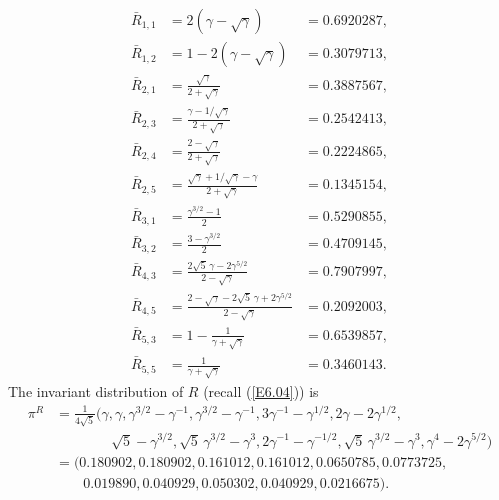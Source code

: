 \documentclass[11pt]{article}
\providecommand{\1}{\mathBB{1}}
\newcommand{\equ}[1]{(\ref{#1})}
\begin{document}
\begin{equation}
\label{E6.14}
\begin{array}{cll}
\bar R_{1,1}&=2(\gamma-\sqrt{\gamma})       &=0.6920287,\\[2mm]
\bar R_{1,2}&=1-2(\gamma-\sqrt{\gamma})      &=0.3079713,\\[2mm]
\bar R_{2,1}&=\frac{\sqrt{\gamma}}{2+\sqrt{\gamma}}&=0.3887567,\\[2mm]
\bar R_{2,3}&=\frac{\gamma-1/\sqrt{\gamma}}{2+\sqrt{\gamma}}&=0.2542413,\\[2mm]
\bar R_{2,4}&=\frac{2-\sqrt{\gamma}}{2+\sqrt{\gamma}}&=0.2224865,\\[2mm]
\bar R_{2,5}&=\frac{\sqrt{\gamma}+1/\sqrt{\gamma}-\gamma}{2+\sqrt{\gamma}}&=0.1345154,\\[2mm]
\bar R_{3,1}&=\frac{\gamma^{3/2}-1}{2}&=0.5290855,\\[2mm]
\bar R_{3,2}&=\frac{3-\gamma^{3/2}}{2}&=0.4709145,\\[2mm]
\bar R_{4,3}&=\frac{2\sqrt{5}\,\gamma-2\gamma^{5/2}}{2-\sqrt{\gamma}}&=0.7907997,\\[2mm]
\bar R_{4,5}&=\frac{2-\sqrt{\gamma}-2\sqrt{5}\,\gamma+2\gamma^{5/2}}{2-\sqrt{\gamma}}&=0.2092003,\\[2mm]
\bar R_{5,3}&=1-\frac{1}{\gamma+\sqrt{\gamma}}&=0.6539857,\\[2mm]
\bar R_{5,5}&=\frac{1}{\gamma+\sqrt{\gamma}}&=0.3460143.
\end{array}
\end{equation}
The invariant distribution of $R$ (recall \equ{E6.04}) is
\begin{equation}
\label{E6.15}
\begin{aligned}
\pi^{R}&=\frac{1}{4\sqrt{5}}\Big(\gamma,\gamma,
\gamma^{3/2}-\gamma^{-1},
\gamma^{3/2}-\gamma^{-1},
3\gamma^{-1}-\gamma^{1/2},
2\gamma-2\gamma^{1/2},\\
&\qquad\qquad\sqrt{5}-\gamma^{3/2},
\sqrt{5}\,\gamma^{3/2}-\gamma^3,
2\gamma^{-1}-\gamma^{-1/2},
\sqrt{5}\,\gamma^{3/2}-\gamma^3,
\gamma^4-2\gamma^{5/2}\Big)\\
&=\big(0.180902, 0.180902, 0.161012, 0.161012, 0.0650785, 0.0773725,\\&
 \phantom{=\;(}  0.019890, 0.040929, 0.050302, 0.040929, 0.0216675\big).
\end{aligned}
\end{equation}
\end{document}
